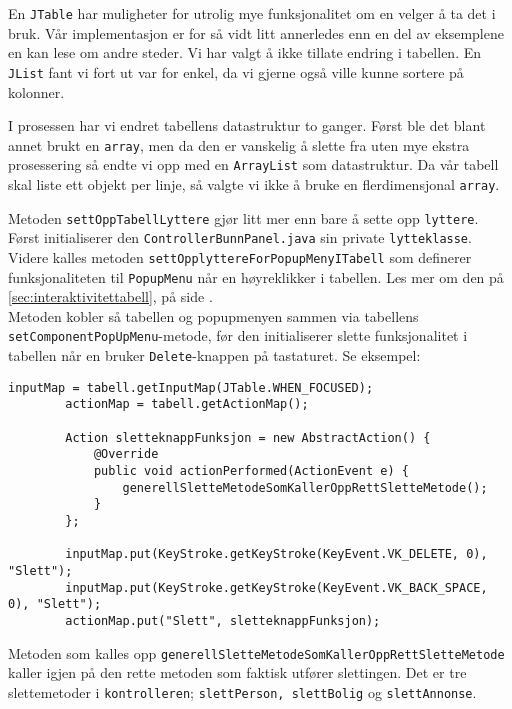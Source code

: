 En \texttt{JTable} har muligheter for utrolig mye funksjonalitet om en velger å ta det i bruk.
Vår implementasjon er for så vidt litt annerledes enn en del av eksemplene en kan lese om andre steder. Vi har valgt å ikke tillate endring i tabellen. En \texttt{JList} fant vi fort ut var for enkel, da vi gjerne også ville kunne sortere på kolonner.

I prosessen har vi endret tabellens datastruktur to ganger. Først ble det blant annet brukt en \texttt{array}, men da den er vanskelig å slette fra uten mye ekstra prosessering så endte vi opp med en \texttt{ArrayList} som datastruktur. Da vår tabell skal liste ett objekt per linje, så valgte vi ikke å bruke en flerdimensjonal \texttt{array}. 

Metoden \texttt{settOppTabellLyttere} gjør litt mer enn bare å sette opp \texttt{lyttere}. Først initialiserer den \texttt{ControllerBunnPanel.java} sin private \texttt{lytteklasse}. \\
Videre kalles metoden \texttt{settOpplyttereForPopupMenyITabell} som definerer funksjonaliteten til \texttt{PopupMenu} når en høyreklikker i tabellen. Les mer om den på \ref{sec:interaktivitettabell}, på side \pageref{sec:interaktivitettabell}. \\
Metoden kobler så tabellen og popupmenyen sammen via tabellens \texttt{setComponentPopUpMenu}-metode, før den initialiserer slette funksjonalitet i tabellen når en bruker \texttt{Delete}-knappen på tastaturet. Se eksempel:


\begin{lstlisting}[caption=Slettefunksjonalitet i tabellen ved å trykke Delete på tastaturet]
        inputMap = tabell.getInputMap(JTable.WHEN_FOCUSED);
        actionMap = tabell.getActionMap();

        Action sletteknappFunksjon = new AbstractAction() {
            @Override
            public void actionPerformed(ActionEvent e) {
                generellSletteMetodeSomKallerOppRettSletteMetode();
            }
        };

        inputMap.put(KeyStroke.getKeyStroke(KeyEvent.VK_DELETE, 0), "Slett");
        inputMap.put(KeyStroke.getKeyStroke(KeyEvent.VK_BACK_SPACE, 0), "Slett");
        actionMap.put("Slett", sletteknappFunksjon);
\end{lstlisting}


Metoden som kalles opp \texttt{generellSletteMetodeSomKallerOppRettSletteMetode} kaller igjen på den rette metoden som faktisk utfører slettingen. Det er tre slettemetoder i \texttt{kontrolleren}; \texttt{slettPerson, slettBolig} og \texttt{slettAnnonse}.

